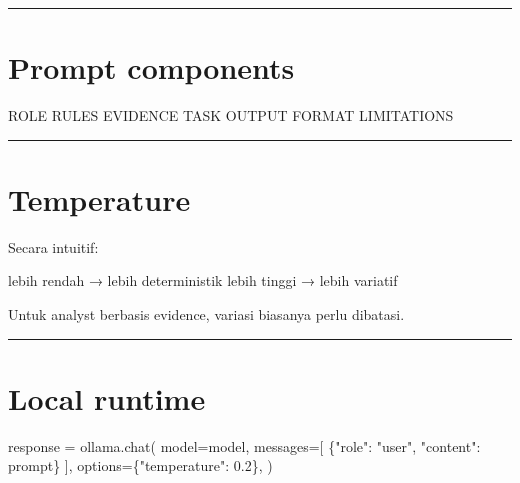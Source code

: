 \documentclass[
  indonesian,
  letterpaper,
  DIV=11,
  numbers=noendperiod]{scrreprt}
\newenvironment{Shaded}{\begin{snugshade}}{\end{snugshade}}
\newcommand{\FloatTok}[1]{\textcolor[rgb]{0.68,0.00,0.00}{#1}}
\newcommand{\NormalTok}[1]{\textcolor[rgb]{0.00,0.23,0.31}{#1}}
\newcommand{\OperatorTok}[1]{\textcolor[rgb]{0.37,0.37,0.37}{#1}}
\newcommand{\StringTok}[1]{\textcolor[rgb]{0.13,0.47,0.30}{#1}}
\begin{document}
\begin{center}\rule{0.5\linewidth}{0.5pt}\end{center}

\section{Prompt components}\label{prompt-components}

\begin{Shaded}
\begin{Highlighting}[]
\NormalTok{ROLE}
\NormalTok{RULES}
\NormalTok{EVIDENCE}
\NormalTok{TASK}
\NormalTok{OUTPUT FORMAT}
\NormalTok{LIMITATIONS}
\end{Highlighting}
\end{Shaded}

\begin{center}\rule{0.5\linewidth}{0.5pt}\end{center}

\section{Temperature}\label{temperature}

Secara intuitif:

\begin{Shaded}
\begin{Highlighting}[]
\NormalTok{lebih rendah → lebih deterministik}
\NormalTok{lebih tinggi → lebih variatif}
\end{Highlighting}
\end{Shaded}

Untuk analyst berbasis evidence, variasi biasanya perlu dibatasi.

\begin{center}\rule{0.5\linewidth}{0.5pt}\end{center}

\section{Local runtime}\label{local-runtime}

\begin{Shaded}
\begin{Highlighting}[]
\NormalTok{response }\OperatorTok{=}\NormalTok{ ollama.chat(}
\NormalTok{    model}\OperatorTok{=}\NormalTok{model,}
\NormalTok{    messages}\OperatorTok{=}\NormalTok{[}
\NormalTok{        \{}\StringTok{"role"}\NormalTok{: }\StringTok{"user"}\NormalTok{, }\StringTok{"content"}\NormalTok{: prompt\}}
\NormalTok{    ],}
\NormalTok{    options}\OperatorTok{=}\NormalTok{\{}\StringTok{"temperature"}\NormalTok{: }\FloatTok{0.2}\NormalTok{\},}
\NormalTok{)}
\end{Highlighting}
\end{Shaded}
\end{document}
